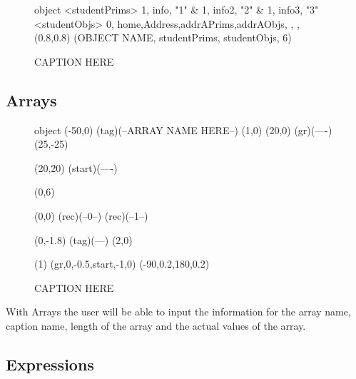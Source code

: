 \documentclass[10pt,a4paper,english]{article}
\begin{document}
\begin{flushleft}
\begin {figure}
\Draw
 {object}
\Indirect \Table <studentPrims>
{  1, info, "1" 		&
   1, info2,  "2"		&
   1, info3,  "3"		
}
\Indirect \Table <studentObjs>
 {  0, home,Address,addrAPrims,addrAObjs, , , }
  \Scale (0.8,0.8)
\OD (OBJECT NAME, studentPrims, studentObjs, 6)
    \EndDraw
\caption {CAPTION HERE}
\label {fig:simpleStudent}
\end {figure}

\subsection*{Arrays}

\newcommand{\ArrayName}
{ARRAY NAME HERE}
\newcommand{\Caption}
{CAPTION HERE}
\newcommand{\ArrayLengthMinusOne}
{6}
\newcommand{\0}
{0}
\newcommand{\1}
{0}
\newcommand{\2}
{95}
\newcommand{\3}
{0}
\newcommand{\4}
{0}
\newcommand{\5}
{0}
\newcommand{\6}
{0}
\newcommand{\7}
{0}
\newcommand{\8}
{0}
\newcommand{\9}
{0}
\newcommand{\ten}
{0}
\newcommand{\eleven}
{0}
\begin {figure}

\Draw

 {object}
\Move(-50,0)
\Node(tag)(--\ArrayName--)
\MoveToExit(1,0)
\Move(20,0)
\ORectNode(gr)(----)
\Move (25,-25)

\MinNodeSize(20,20)
\Node(start)(----)

\Do(0,\ArrayLengthMinusOne)
{  
	\IF 
    	\EqInt(0,0) 				
        	\THEN
 				\RectNode(rec)(--0--)
   \ELSE
   		\RectNode(rec)(--1--)
   		
 		   \FI
   { 	\MoveToExit(0,-1.8)
 	\Node(tag)(--\DoReg--)
   }
   \MoveToExit(2,0)
}
\ArrowHeads(1)
\CurvedEdgeAt(gr,0,-0.5,start,-1,0) (-90,0.2,180,0.2)
\EndDraw
\caption {\Caption}
\label {fig:array}
\end {figure}

With Arrays the user will be able to input the information for the array name, caption name, length of the array and the actual values of the array.  

\subsection*{Expressions}


\end{flushleft}
\end{document}
